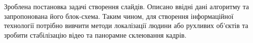 \chapterConclusion

Зроблена постановка задачі створення слайдів. Описано ввідні 
дані алгоритму та запропонована його блок-схема. 
Таким чином, для створення інформаційної технології 
потрібно вивчити методи локалізації людини або рухливих об'єктів та
зробити стабілізацію відео та панорамне склеювання кадрів. 